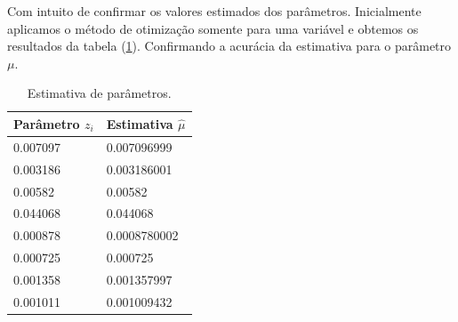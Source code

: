\documentclass[journal,article,submit,moreauthors,pdftex]{Definitions/mdpi}
\begin{document}
Com intuito de confirmar os valores estimados dos parâmetros. Inicialmente aplicamos o método de otimização somente para uma variável e obtemos os resultados da tabela (\ref{tab_est_mu_z_fixo_l_fixo}). Confirmando a acurácia da estimativa para o parâmetro $\mu$.
\begin{table}[hbt]
	\centering
	\caption{Estimativa de parâmetros.}\label{tab_est_mu_z_fixo_l_fixo}
\begin{tabular}{@{}ll@{}} \toprule
	Parâmetro $z_i$  & Estimativa $\hat{\mu}$ \\ \midrule
	0.007097 &  0.007096999 \\ 
	0.003186 & 0.003186001 \\
	0.00582&  0.00582\\
	0.044068 & 0.044068 \\
	0.000878&  0.0008780002\\
	 0.000725& 0.000725 \\
	 0.001358&  0.001357997\\ 
	 0.001011&  0.001009432 \\ \bottomrule
\end{tabular}
\end{table}
\end{document}
